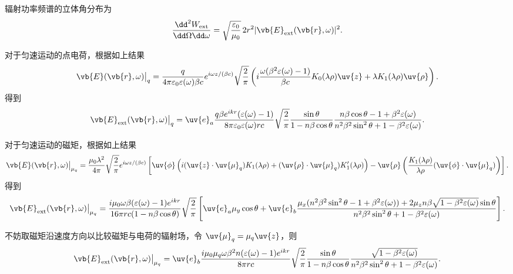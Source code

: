 辐射功率频谱的立体角分布为
\begin{align*}
	\frac{\dd^{2} W_{\mathrm{ext}}}{\dd \Omega \dd \omega} = \sqrt{\frac{\varepsilon_{0}}{\mu_{0}}} \, 2 r^{2} | \vb{E}_{\mathrm{ext}}(\vb{r}, \omega) |^{2}.
\end{align*}

对于匀速运动的点电荷，根据如上结果
\begin{align*}
	\vb{E}(\vb{r}, \omega)\big|_{q} = \frac{q}{4\pi \varepsilon_{0} \varepsilon(\omega) \beta c} e^{i\omega z/(\beta c)} \sqrt{\frac{2}{\pi}} \left( i \frac{\omega (\beta^{2} \varepsilon(\omega) - 1)}{\beta c} K_{0}(\lambda \rho) \uv{z} + \lambda K_{1}(\lambda \rho) \uv{\rho} \right).
\end{align*}
得到
\begin{align*}
	\vb{E}_{\mathrm{ext}}(\vb{r}, \omega)\big|_{q} = \uv{e}_{a} \frac{q \beta e^{i k r} (\varepsilon(\omega) - 1)}{8\pi \varepsilon_{0} \varepsilon(\omega) r c} \sqrt{\frac{2}{\pi}} \frac{\sin\theta}{1 - n \beta \cos\theta} \frac{n \beta \cos\theta - 1 + \beta^{2} \varepsilon(\omega)}{n^{2} \beta^{2} \sin^{2}\theta + 1 - \beta^{2} \varepsilon(\omega)}.
\end{align*}

对于匀速运动的磁矩，根据如上结果
\begin{align*}
	\vb{E}(\vb{r}, \omega)\big|_{\mu_{q}} = \frac{\mu_{0} \lambda^{2}}{4\pi} \sqrt{\frac{2}{\pi}} e^{i\omega z/(\beta c)} \left[ \uv{\phi} \left( i (\uv{z} \cdot \uv{\mu}_{q}) K_{1}(\lambda \rho) + (\uv{\rho} \cdot \uv{\mu}_{q}) K_{1}'(\lambda \rho) \right) - \uv{\rho} \left( \frac{K_{1}(\lambda \rho)}{\lambda \rho} (\uv{\phi} \cdot \uv{\mu}_{q}) \right) \right].
\end{align*}
得到
\begin{align*}
	\vb{E}_{\mathrm{ext}}(\vb{r}, \omega)\big|_{\mu_{q}} = \frac{i \mu_{0} \omega \beta (\varepsilon(\omega) - 1) e^{i k r}}{16\pi r c (1 - n \beta \cos\theta)} \sqrt{\frac{2}{\pi}} \left[ \uv{e}_{a} \mu_{y} \cos\theta + \uv{e}_{b} \frac{\mu_{x} (n^{2} \beta^{2} \sin^{2}\theta - 1 + \beta^{2} \varepsilon(\omega)) + 2 \mu_{z} n \beta \sqrt{1 - \beta^{2} \varepsilon(\omega)} \sin\theta}{n^{2} \beta^{2} \sin^{2}\theta + 1 - \beta^{2} \varepsilon(\omega)} \right].
\end{align*}

不妨取磁矩沿速度方向以比较磁矩与电荷的辐射场，令 \(\uv{\mu}_{q} = \mu_{q} \uv{z}\)，则
\begin{align*}
	\vb{E}_{\mathrm{ext}}(\vb{r}, \omega)\big|_{\mu_{q}} = \uv{e}_{b} \frac{i \mu_{0} \mu_{q} \omega \beta^{2} n (\varepsilon(\omega) - 1) e^{i k r}}{8\pi r c} \sqrt{\frac{2}{\pi}} \frac{\sin\theta}{1 - n \beta \cos\theta} \frac{\sqrt{1 - \beta^{2} \varepsilon(\omega)}}{n^{2} \beta^{2} \sin^{2}\theta + 1 - \beta^{2} \varepsilon(\omega)}.
\end{align*}


